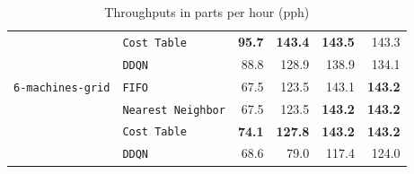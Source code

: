 \documentclass[sn-mathphys]{sn-jnl}
\begin{document}
\begin{table}[ht]
\begin{tabular}{|l|l||r|r|r|r|}
 & \texttt{Cost Table} & \textbf{95.7} \quad & \textbf{143.4} \quad & \textbf{143.5} \quad & 143.3  \quad  \\ 
 & \texttt{DDQN} & 88.8  \quad & 128.9  \quad & 138.9  \quad & 134.1  \quad  \\ 
\hline \texttt{6-machines-grid} & \texttt{FIFO}& 67.5  \quad & 123.5  \quad & 143.1  \quad & \textbf{143.2} \quad  \\ 
 & \texttt{Nearest Neighbor} & 67.5  \quad & 123.5  \quad & \textbf{143.2} \quad & \textbf{143.2} \quad  \\ 
 & \texttt{Cost Table} & \textbf{74.1} \quad & \textbf{127.8} \quad & \textbf{143.2} \quad & \textbf{143.2} \quad  \\ 
 & \texttt{DDQN} & 68.6  \quad & 79.0  \quad & 117.4  \quad & 124.0  \quad  \\ 
\hline
\end{tabular}

\egroup
\caption{Throughputs in parts per hour (pph)}
\label{tab:results_throughput}
\end{table}

    
\end{document}
